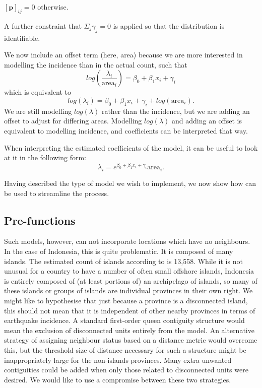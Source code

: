 \([\textbf{p}]_{ij} = 0\) otherwise.

A further constraint that \(\Sigma_j \gamma_j = 0\) is applied so that the
distribution is identifiable.

We now include an offset term (here, area) because we are more interested
in modelling the incidence than in the actual count, such that
\begin{equation}
log(\frac{\lambda_i} {\text{area}_i}) = \beta_0 + \beta_1x_i + \gamma_i
\label{eq:eq6}
\end{equation}
which is equivalent to
\begin{equation}
log(\lambda_i) = \beta_0 + \beta_1x_i + \gamma_i + log(\text{area}_i).
\label{eq:eq7}
\end{equation}
We are still modelling \(log(\lambda)\) rather than the incidence, but we
are adding an offset to adjust for differing areas. Modelling \(log(\lambda)\) and adding an offset is equivalent to
modelling incidence, and coefficients can be interpreted that way.

When interpreting the estimated coefficients of the model, it can be
useful to look at it in the following form:
\begin{equation}
\lambda_i = e^{\beta_0 + \beta_1 x_i + \gamma_i} \text{area}_i.
\label{eq:eq8}
\end{equation}

Having described the type of model we wish to implement, we now show how  can be used to streamline the process.

\subsection{Pre-functions}\label{pre-functions-1}

Such models, however, can not incorporate locations which have no
neighbours. In the case of Indonesia, this is quite problematic. It is
composed of many islands. The estimated count of
islands according to \citet{Andrfout2022} is 13,558.
While it is not unusual for a country to have a number of often small
offshore islands, Indonesia is entirely composed of (at least portions
of) an archipelago of islands, so many of these islands or groups of
islands are individual provinces in their own right. We might like to hypothesise that just because a province is a disconnected island, this should not mean that it is independent of other nearby provinces in terms of earthquake incidence. A standard first-order queen contiguity structure would mean the exclusion of disconnected units entirely from the model. An alternative strategy of assigning neighbour status based on a distance metric would overcome this, but the threshold size of distance necessary for such a structure might be inappropriately large for the non-islands provinces. Many extra unwanted contiguities could be added when only those related to disconnected units were desired. We would like to use a compromise between these two strategies.

